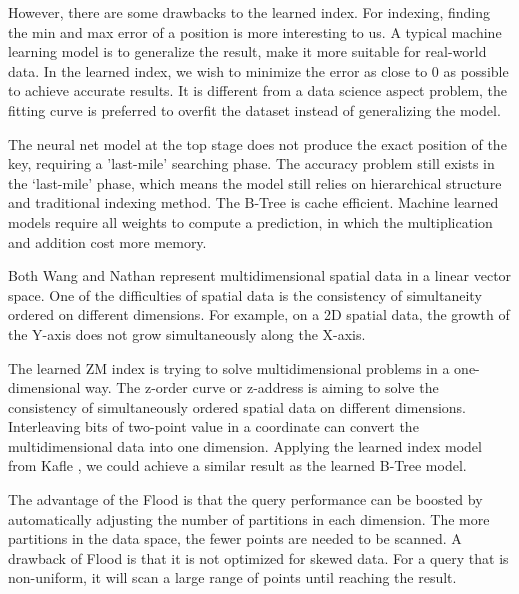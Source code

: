 However, there are some drawbacks to the learned index. For indexing, finding the min and max error of a position is more interesting to us. A typical machine learning model is to generalize the result, make it more suitable for real-world data. In the learned index, we wish to minimize the error as close to 0 as possible to achieve accurate results. It is different from a data science aspect problem, the fitting curve is preferred to overfit the dataset instead of generalizing the model. 

The neural net model at the top stage does not produce the exact position of the key, requiring a 'last-mile' searching phase. The accuracy problem still exists in the ‘last-mile’ phase, which means the model still relies on hierarchical structure and traditional indexing method. The B-Tree is cache efficient. Machine learned models require all weights to compute a prediction, in which the multiplication and addition cost more memory. 
 

Both Wang \cite{Wang:2019ks} and Nathan \cite{Nathan:2019wc} represent multidimensional spatial data in a linear vector space. One of the difficulties of spatial data is the consistency of simultaneity ordered on different dimensions. For example, on a 2D spatial data, the growth of the Y-axis does not grow simultaneously along the X-axis. 


The learned ZM index is trying to solve multidimensional problems in a one-dimensional way. The z-order curve or z-address is aiming to solve the consistency of simultaneously ordered spatial data on different dimensions. Interleaving bits of two-point value in a coordinate can convert the multidimensional data into one dimension. Applying the learned index model from Kafle \cite{Kafle:2017dy}, we could achieve a similar result as the learned B-Tree model. 

The advantage\cite{Ding:2020we} of the Flood is that the query performance can be boosted by automatically adjusting the number of partitions in each dimension. The more partitions in the data space, the fewer points are needed to be scanned. A drawback of Flood is that it is not optimized for skewed data. For a query that is non-uniform, it will scan a large range of points until reaching the result. 


